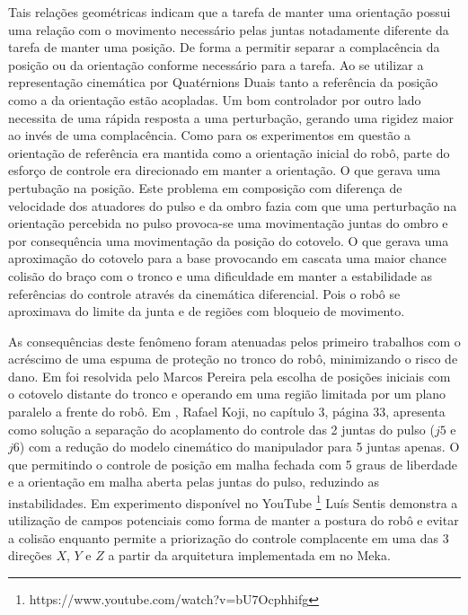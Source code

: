 Tais relações geométricas indicam que a tarefa de manter uma orientação possui uma relação com o movimento necessário pelas juntas notadamente diferente da tarefa de manter uma posição. De forma a permitir separar a complacência da posição ou da orientação conforme necessário para a tarefa. Ao se utilizar a representação cinemática por Quatérnions Duais tanto a referência da posição como a da orientação estão acopladas. Um bom controlador por outro lado necessita de uma rápida resposta a uma perturbação, gerando uma rigidez maior ao invés de uma complacência. Como para os experimentos em questão a orientação de referência era mantida como a orientação inicial do robô, parte do esforço de controle era direcionado em manter a orientação. O que gerava uma pertubação na posição. Este problema em composição com diferença de velocidade dos atuadores do pulso e da ombro fazia com que uma perturbação na orientação percebida no pulso provoca-se uma movimentação juntas do ombro e por consequência uma movimentação da posição do cotovelo. O que gerava uma aproximação do cotovelo para a base provocando em cascata uma maior chance colisão do braço com o tronco e uma dificuldade em manter a estabilidade as referências do controle através da cinemática diferencial. Pois o robô se aproximava do limite da junta e de regiões com bloqueio de movimento.

As consequências deste fenômeno foram atenuadas pelos primeiro trabalhos com o acréscimo de uma espuma de proteção no tronco do robô, minimizando o risco de dano. Em \cite{nobody} foi resolvida pelo Marcos Pereira pela escolha de posições iniciais com o cotovelo distante do tronco e operando em uma região limitada por um plano paralelo a frente do robô. Em \cite{nobody}, Rafael Koji, no capítulo 3, página 33, apresenta como solução a separação do acoplamento do controle das 2 juntas do pulso ($j5$ e $j6$) com a redução do modelo cinemático do manipulador para 5 juntas apenas. O que permitindo o controle de posição em malha fechada com 5 graus de liberdade e a orientação em malha aberta pelas juntas do pulso, reduzindo as instabilidades. Em experimento disponível no YouTube \footnote{https://www.youtube.com/watch?v=bU7Ocphhifg} Luís Sentis demonstra a utilização de campos potenciais como forma de manter a postura do robô e evitar a colisão enquanto permite a priorização do controle complacente em uma das 3 direções $X$, $Y$ e $Z$ a partir da arquitetura implementada em \cite{sentis2007synthesis} no Meka.


